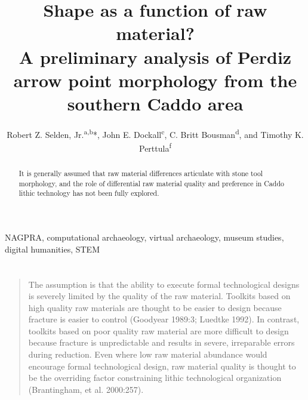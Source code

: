 \documentclass[review]{elsarticle}
\begin{document}
\begin{frontmatter}

\title{Shape as a function of raw material?\\ A preliminary analysis of Perdiz arrow point morphology from the southern Caddo area}


\author{Robert Z. Selden, Jr.\textsuperscript{a,b}*, John E. Dockall\textsuperscript{c}, C. Britt Bousman\textsuperscript{d}, and Timothy K. Perttula\textsuperscript{f}}
\address[1]{Heritage Research Center, Stephen F. Austin State University, USA}
\address[2]{Cultural Heritage Department, Jean Monnet University, FR}
\address[3]{Cox|McClain Environmental Consulting, Inc., USA}
\address[4]{Department of Anthropology, Texas State University, USA}
\address[5]{Archeological \& Environmental Consultants, LLC, USA}

\begin{abstract}
It is generally assumed that raw material differences articulate with stone tool morphology, and the role of differential raw material quality and preference in Caddo lithic technology has not been fully explored.
\end{abstract}

\begin{keyword}
NAGPRA, computational archaeology, virtual archaeology, museum studies, digital humanities, STEM
\end{keyword}

\end{frontmatter}

\linenumbers

\newpage
\section*{}

\begin{quote}
The assumption is that the ability to execute formal technological designs is severely limited by the quality of the raw material. Toolkits based on high quality raw materials are thought to be easier to design because fracture is easier to control (Goodyear 1989:3; Luedtke 1992). In contrast, toolkits based on poor quality raw material are more difficult to design because fracture is unpredictable and results in severe, irreparable errors during reduction. Even where low raw material abundance would encourage formal technological design, raw material quality is thought to be the overriding factor constraining lithic technological organization (Brantingham, et al. 2000:257).
\end{quote}
\end{document}
